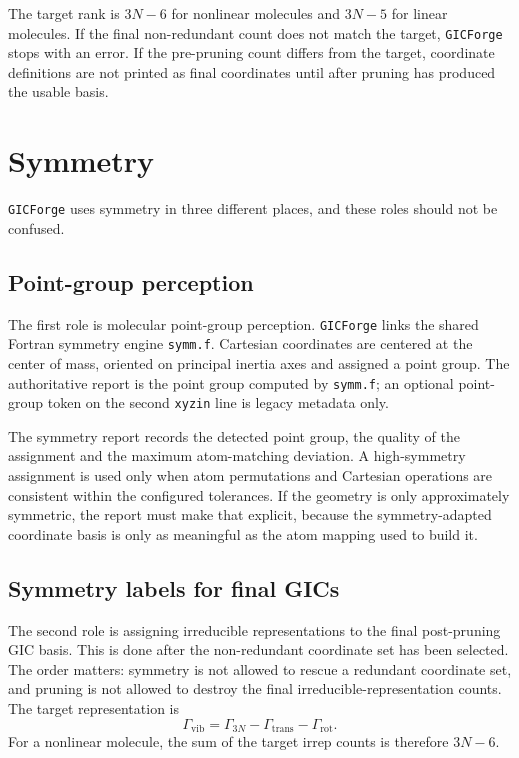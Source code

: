 \documentclass[11pt]{article}
\newcommand{\program}{\texttt{GICForge}}
\newcommand{\xyzin}{\texttt{xyzin}}
\begin{document}
The target rank is \(3N-6\) for nonlinear molecules and \(3N-5\) for linear
molecules.  If the final non-redundant count does not match the target,
\program{} stops with an error.  If the pre-pruning count differs from the
target, coordinate definitions are not printed as final coordinates until after
pruning has produced the usable basis.

\section{Symmetry}

\program{} uses symmetry in three different places, and these roles should not
be confused.

\subsection{Point-group perception}

The first role is molecular point-group perception.  \program{} links the
shared Fortran symmetry engine \texttt{symm.f}.  Cartesian coordinates are
centered at the center of mass, oriented on principal inertia axes and assigned
a point group.  The authoritative report is the point group computed by
\texttt{symm.f}; an optional point-group token on the second \xyzin{} line is
legacy metadata only.

The symmetry report records the detected point group, the quality of the
assignment and the maximum atom-matching deviation.  A high-symmetry assignment
is used only when atom permutations and Cartesian operations are consistent
within the configured tolerances.  If the geometry is only approximately
symmetric, the report must make that explicit, because the symmetry-adapted
coordinate basis is only as meaningful as the atom mapping used to build it.

\subsection{Symmetry labels for final GICs}

The second role is assigning irreducible representations to the final
post-pruning GIC basis.  This is done after the non-redundant coordinate set has
been selected.  The order matters: symmetry is not allowed to rescue a
redundant coordinate set, and pruning is not allowed to destroy the final
irreducible-representation counts.  The target representation is
\[
  \Gamma_\mathrm{vib} = \Gamma_{3N}-\Gamma_\mathrm{trans}-\Gamma_\mathrm{rot}.
\]
For a nonlinear molecule, the sum of the target irrep counts is therefore
\(3N-6\).
\end{document}

